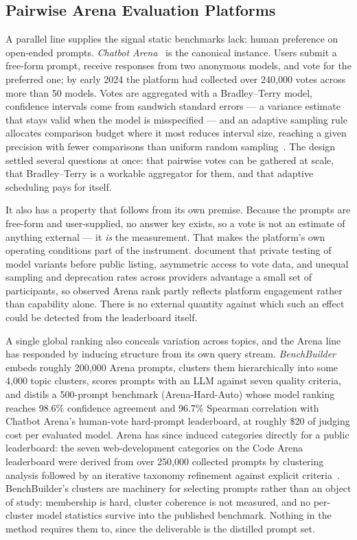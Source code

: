 \subsection*{Pairwise Arena Evaluation Platforms}

A parallel line supplies the signal static benchmarks lack: human
preference on open-ended prompts. \textit{Chatbot
Arena}~\parencite{chiang2024chatbotarena} is the canonical instance.
Users submit a free-form prompt, receive responses from two anonymous
models, and vote for the preferred one; by early 2024 the platform
had collected over 240{,}000 votes across more than 50 models. Votes are
aggregated with a Bradley--Terry model, confidence intervals come
from sandwich standard errors --- a variance estimate that stays valid
when the model is misspecified --- and an adaptive sampling rule
allocates comparison budget where it most reduces interval size,
reaching a given precision with fewer comparisons than uniform random
sampling~\parencite{chiang2024chatbotarena}. The
design settled several questions at once: that pairwise votes can be
gathered at scale, that Bradley--Terry is a workable aggregator for
them, and that adaptive scheduling pays for itself.

It also has a property that follows from its own premise. Because the
prompts are free-form and user-supplied, no answer key exists, so a
vote is not an estimate of anything external --- it \textit{is} the
measurement. That makes the platform's own operating conditions part
of the instrument. \textcite{singh2025leaderboard} document that
private testing of model variants before public listing, asymmetric
access to vote data, and unequal sampling and deprecation rates
across providers advantage a small set of participants, so observed
Arena rank partly reflects platform engagement rather than capability
alone. There is no external quantity against which such an effect
could be detected from the leaderboard itself.

A single global ranking also conceals variation across topics, and
the Arena line has responded by inducing structure from its own query
stream. \textit{BenchBuilder}~\parencite{li2024benchbuilder} embeds
roughly 200{,}000 Arena prompts, clusters them hierarchically into some
4{,}000 topic clusters, scores prompts with an LLM against seven
quality criteria, and distils a 500-prompt benchmark
(Arena-Hard-Auto) whose model ranking reaches 98.6\% confidence
agreement and 96.7\% Spearman correlation with Chatbot Arena's
human-vote hard-prompt leaderboard, at roughly \$20 of judging cost
per evaluated model. Arena has since induced categories directly for a
public leaderboard: the seven web-development categories on the Code
Arena leaderboard were derived from over 250{,}000 collected prompts by
clustering analysis followed by an iterative taxonomy refinement
against explicit criteria~\parencite{arena2025categories}.
BenchBuilder's clusters are
machinery for selecting prompts rather than an object of study:
membership is hard, cluster coherence is not measured, and no
per-cluster model statistics survive into the published benchmark.
Nothing in the method requires them to, since the deliverable is the
distilled prompt set.

